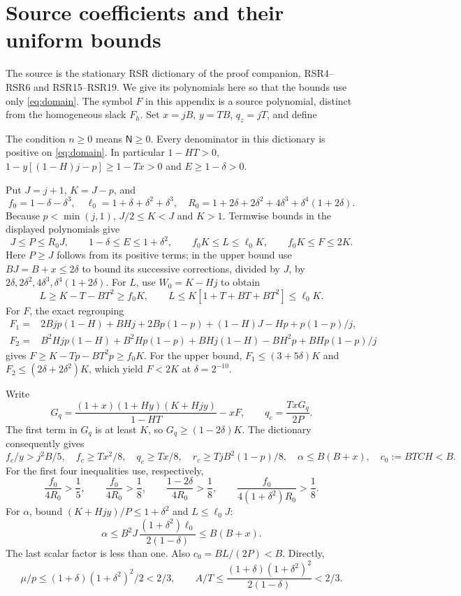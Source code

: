 \section{Source coefficients and their uniform bounds}\label{app:source}
The source is the stationary RSR dictionary of the proof companion,
RSR4--RSR6 and RSR15--RSR19. We give its polynomials here so that the
bounds use only \eqref{eq:domain}. The symbol $F$ in this appendix is a
source polynomial, distinct from the homogeneous slack $F_h$.
Set $x=jB$, $y=TB$, $q_z=jT$, and define

The condition $n\geq0$ means $\mathsf N\geq0$.
Every denominator in this dictionary is positive on \eqref{eq:domain}.
In particular $1-HT>0$,
$1-y[(1-H)j-p]\geq1-Tx>0$ and $E\geq1-\delta>0$.

Put $J=j+1$, $K=J-p$, and
\[
 f_0=1-\delta-\delta^3,\quad
 \ell_0=1+\delta+\delta^2+\delta^3,\quad
 R_0=1+2\delta+2\delta^2+4\delta^3+\delta^4(1+2\delta).
\]
Because $p<\min(j,1)$, $J/2\leq K<J$ and $K>1$.
Termwise bounds in the displayed polynomials give
\begin{equation}
 J\leq P\leq R_0J,\qquad
 1-\delta\leq E\leq1+\delta^2,\qquad
 f_0K\leq L\leq\ell_0K,\qquad f_0K\leq F\leq2K.
 \label{eq:fullsourcebounds}
\end{equation}
Here $P\geq J$ follows from its positive terms; in the upper bound use
$BJ=B+x\leq2\delta$ to bound its successive corrections, divided by $J$,
by $2\delta,2\delta^2,4\delta^3,\delta^4(1+2\delta)$.
For $L$, use $W_0=K-Hj$ to obtain
\[
 L\geq K-T-BT^2\geq f_0K,\qquad
 L\leq K[1+T+BT+BT^2]\leq\ell_0K.
\]
For $F$, the exact regrouping
\begin{align*}
 F_1={}&2Bjp(1-H)+BHj+2Bp(1-p)+(1-H)J-Hp+p(1-p)/j,\\
 F_2={}&B^2Hjp(1-H)+B^2Hp(1-p)+BHj(1-H)-BH^2p+BHp(1-p)/j
\end{align*}
gives $F\geq K-Tp-BT^2p\geq f_0K$.
For the upper bound,
$F_1\leq(3+5\delta)K$ and $F_2\leq(2\delta+2\delta^2)K$,
which yield $F<2K$ at $\delta=2^{-10}$.

Write
\[
 G_q=\frac{(1+x)(1+Hy)(K+Hjy)}{1-HT}-xF,\qquad
 q_c=\frac{TxG_q}{2P}.
\]
The first term in $G_q$ is at least $K$, so $G_q\geq(1-2\delta)K$.
The dictionary consequently gives
\begin{equation}
 f_c/y>j^2B/5,\quad
 f_c\geq Tx^2/8,\quad q_c\geq Tx/8,\quad
 r_c\geq TjB^2(1-p)/8,\quad
 \alpha\leq B(B+x),\quad c_0:=BTCH<B .
 \label{eq:positivesourcebounds}
\end{equation}
For the first four inequalities use, respectively,
\[
 \frac{f_0}{4R_0}>\frac15,\qquad
 \frac{f_0}{4R_0}>\frac18,\qquad
 \frac{1-2\delta}{4R_0}>\frac18,\qquad
 \frac{f_0}{4(1+\delta^2)R_0}>\frac18 .
\]
For $\alpha$, bound $(K+Hjy)/P\leq1+\delta^2$ and $L\leq\ell_0J$:
\[
 \alpha\leq B^2J\,\frac{(1+\delta^2)\ell_0}{2(1-\delta)}
 \leq B(B+x).
\]
The last scalar factor is less than one. Also $c_0=BL/(2P)<B$.
Directly,
\begin{equation}
 \mu/p\leq(1+\delta)(1+\delta^2)^2/2<2/3,\qquad
 A/T\leq\frac{(1+\delta)(1+\delta^2)^2}{2(1-\delta)}<2/3 .
 \label{eq:mubounds}
\end{equation}

